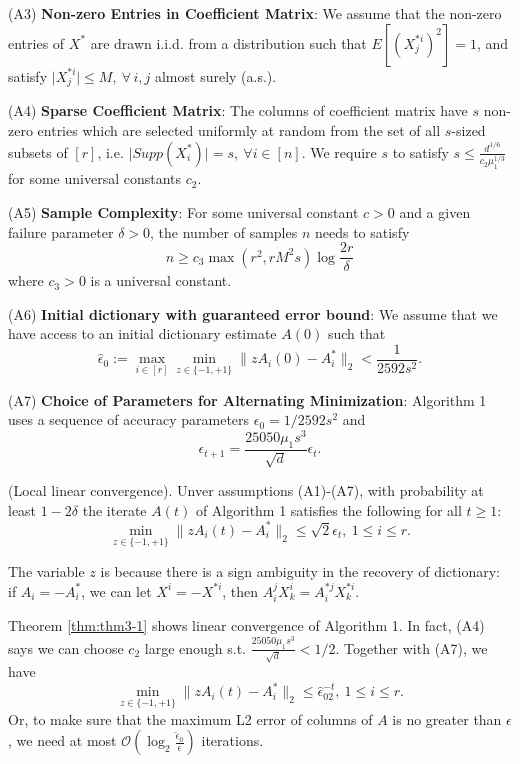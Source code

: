 (A3) \textbf{Non-zero Entries in Coefficient Matrix}: We assume that the non-zero entries of $X^*$ are drawn i.i.d. from a distribution such that $E[(X^{*i}_j)^2]=1$, and satisfy $\lvert X^{*i}_j\rvert \leq M,~\forall\, i,j$ almost surely (a.s.).

(A4) \textbf{Sparse Coefficient Matrix}: The columns of coefficient matrix have $s$ non-zero entries which are selected uniformly at random from the set of all $s$-sized subsets of $[r]$, i.e. $\lvert Supp(X^{*}_i)\rvert=s,~\forall i\in [n]$. We require $s$ to satisfy $s\leq \frac{d^{1/6}}{c_2\mu_1^{1/3}}$ for some universal constants $c_2$.

(A5) \textbf{Sample Complexity}: For some universal constant $c>0$ and a given failure parameter $\delta >0$, the number of samples $n$ needs to satisfy
\begin{equation*}
n\geq c_3 \max(r^2,rM^2s)\log\frac{2r}{\delta}
\end{equation*}
where $c_3>0$ is a universal constant.

(A6) \textbf{Initial dictionary with guaranteed error bound}: We assume that we have access to an initial dictionary estimate $A(0)$ such that
\begin{equation*}
\hat{\epsilon}_0:=\max_{i\in [r]}\min_{z\in \{-1,+1\}}\lVert zA_i(0)-A_i^*\rVert_2<\frac{1}{2592s^2}.
\end{equation*}

(A7) \textbf{Choice of Parameters for Alternating Minimization}: Algorithm 1 uses a sequence of accuracy parameters $\epsilon_0=1/2592s^2$ and 
\begin{equation*}
\epsilon_{t+1}=\frac{25050\mu_1s^3}{\sqrt{d}}\epsilon_t.
\end{equation*}

\begin{theorem}
(Local linear convergence). Unver assumptions (A1)-(A7), with probability at least $1-2\delta$ the iterate $A(t)$ of Algorithm 1 satisfies the following for all $t\geq 1$:
\begin{equation*}
\min_{z\in \{-1,+1\}}\lVert zA_i(t)-A_i^*\rVert_2\leq \sqrt{2}\epsilon_t,~1\leq i \leq r.
\end{equation*}
\label{thm:thm3-1}
\end{theorem}

The variable $z$ is because there is a sign ambiguity in the recovery of dictionary: if $A_i=-A_i^*$, we can let $X^i=-X^{*i}$, then $A^j_iX^i_k=A^{*j}_iX^{*i}_k$.

Theorem \ref{thm:thm3-1} shows linear convergence of Algorithm 1. In fact, (A4) says we can choose $c_2$ large enough s.t. $\frac{25050\mu_1s^3}{\sqrt{d}}<1/2$. Together with (A7), we have
\begin{equation*}
\min_{z\in \{-1,+1\}}\lVert zA_i(t)-A_i^*\rVert_2\leq \hat{\epsilon}_02^{-t},~1\leq i \leq r.
\end{equation*}
Or, to make sure that the maximum L2 error of columns of $A$ is no greater than $\epsilon$, we need at most $\mathcal{O}(\log_2\frac{\hat{\epsilon}_0}{\epsilon})$ iterations.

